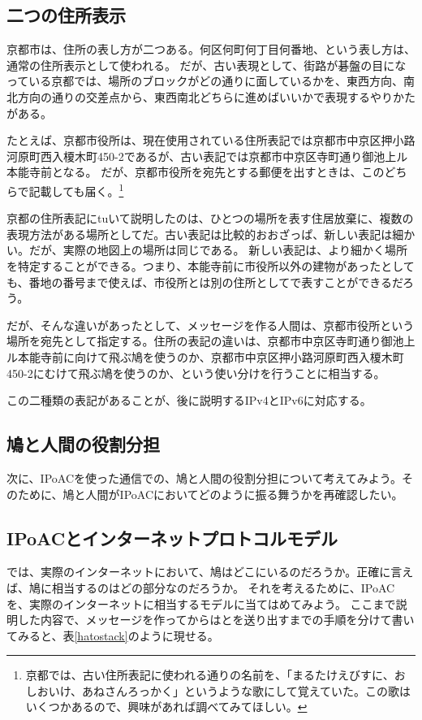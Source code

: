 \subsection{二つの住所表示}

京都市は、住所の表し方が二つある。何区何町何丁目何番地、という表し方は、通常の住所表示として使われる。
だが、古い表現として、街路が碁盤の目になっている京都では、場所のブロックがどの通りに面しているかを、東西方向、南北方向の通りの交差点から、東西南北どちらに進めばいいかで表現するやりかたがある。

たとえば、京都市役所は、現在使用されている住所表記では京都市中京区押小路河原町西入榎木町450-2であるが、古い表記では京都市中京区寺町通り御池上ル本能寺前となる。
だが、京都市役所を宛先とする郵便を出すときは、このどちらで記載しても届く。\footnote{京都では、古い住所表記に使われる通りの名前を、「まるたけえびすに、おしおいけ、あねさんろっかく」というような歌にして覚えていた。この歌はいくつかあるので、興味があれば調べてみてほしい。}

京都の住所表記にtuいて説明したのは、ひとつの場所を表す住居放棄に、複数の表現方法がある場所としてだ。古い表記は比較的おおざっぱ、新しい表記は細かい。だが、実際の地図上の場所は同じである。
新しい表記は、より細かく場所を特定することができる。つまり、本能寺前に市役所以外の建物があったとしても、番地の番号まで使えば、市役所とは別の住所としてで表すことができるだろう。

だが、そんな違いがあったとして、メッセージを作る人間は、京都市役所という場所を宛先として指定する。住所の表記の違いは、京都市中京区寺町通り御池上ル本能寺前に向けて飛ぶ鳩を使うのか、京都市中京区押小路河原町西入榎木町450-2にむけて飛ぶ鳩を使うのか、という使い分けを行うことに相当する。

この二種類の表記があることが、後に説明するIPv4とIPv6に対応する。



\subsection{鳩と人間の役割分担}
次に、IPoACを使った通信での、鳩と人間の役割分担について考えてみよう。そのために、鳩と人間がIPoACにおいてどのように振る舞うかを再確認したい。





\subsection{IPoACとインターネットプロトコルモデル}
では、実際のインターネットにおいて、鳩はどこにいるのだろうか。正確に言えば、鳩に相当するのはどの部分なのだろうか。
それを考えるために、IPoACを、実際のインターネットに相当するモデルに当てはめてみよう。
ここまで説明した内容で、メッセージを作ってからはとを送り出すまでの手順を分けて書いてみると、表\ref{hatostack}のように現せる。

